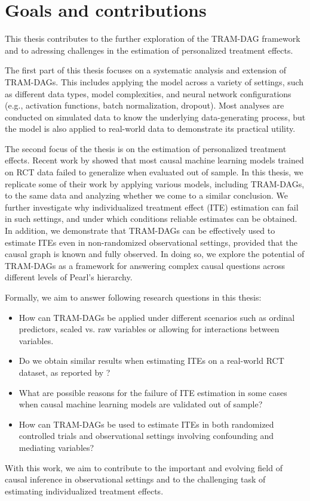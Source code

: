 \section{Goals and contributions} \label{sec:goals_contributions}

This thesis contributes to the further exploration of the TRAM-DAG framework and to adressing challenges in the estimation of personalized treatment effects.

The first part of this thesis focuses on a systematic analysis and extension of TRAM-DAGs. This includes applying the model across a variety of settings, such as different data types, model complexities, and neural network configurations (e.g., activation functions, batch normalization, dropout). Most analyses are conducted on simulated data to know the underlying data-generating process, but the model is also applied to real-world data to demonstrate its practical utility.

The second focus of the thesis is on the estimation of personalized treatment effects. Recent work by \citet{chen2025} showed that most causal machine learning models trained on RCT data failed to generalize when evaluated out of sample. In this thesis, we replicate some of their work by applying various models, including TRAM-DAGs, to the same data and analyzing whether we come to a similar conclusion. We further investigate why individualized treatment effect (ITE) estimation can fail in such settings, and under which conditions reliable estimates can be obtained. In addition, we demonstrate that TRAM-DAGs can be effectively used to estimate ITEs even in non-randomized observational settings, provided that the causal graph is known and fully observed. In doing so, we explore the potential of TRAM-DAGs as a framework for answering complex causal questions across different levels of Pearl's hierarchy.



Formally, we aim to answer following research questions in this thesis:

\begin{itemize}
    \item How can TRAM-DAGs be applied under different scenarios such as ordinal predictors, scaled vs. raw variables or allowing for interactions between variables.
    \item Do we obtain similar results when estimating ITEs on a real-world RCT dataset, as reported by \citet{chen2025}?
    \item What are possible reasons for the failure of ITE estimation in some cases when causal machine learning models are validated out of sample?
    \item How can TRAM-DAGs be used to estimate ITEs in both randomized controlled trials and observational settings involving confounding and mediating variables?
\end{itemize}



With this work, we aim to contribute to the important and evolving field of causal inference in observational settings and to the challenging task of estimating individualized treatment effects.
